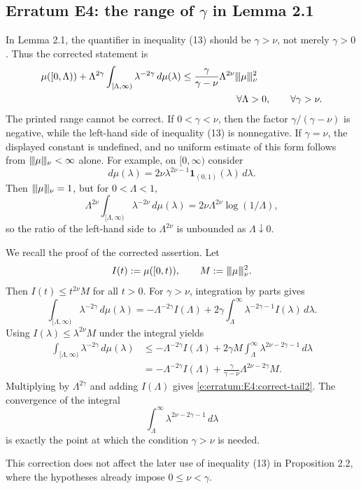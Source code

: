 
\subsection*{Erratum E4: the range of $\gamma$ in Lemma 2.1}
\label{s:erratum:E4}

In Lemma 2.1, the quantifier in inequality (13) should be
$\gamma>\nu$, not merely $\gamma>0$.  Thus the corrected statement is
\begin{equation}
\begin{split}
	\mu([0,\Lambda))
	+
	\Lambda^{2\gamma}
	\int_{[\Lambda,\infty)}\lambda^{-2\gamma}\,d\mu(\lambda)
	&\leq
	\frac{\gamma}{\gamma-\nu}
	\Lambda^{2\nu}\vert\kern-0.25ex\vert\kern-0.25ex\vert \mu \vert\kern-0.25ex \vert\kern-0.25ex\vert_{ \nu }^{2} \\
	&\hspace{2cm}
	\forall\Lambda>0,
	\qquad
	\forall\gamma>\nu .
\end{split}
\label{e:erratum:E4:correct-tail2}
\end{equation}
The printed range cannot be correct.  If $0<\gamma<\nu$, then the factor
$\gamma/(\gamma-\nu)$ is negative, while the left-hand side of
inequality (13) is nonnegative.  If $\gamma=\nu$, the displayed constant is
undefined, and no uniform estimate of this form follows from
$\vert\kern-0.25ex\vert\kern-0.25ex\vert \mu \vert\kern-0.25ex \vert\kern-0.25ex\vert_{ \nu }<\infty$ alone.  For example, on $[0,\infty)$ consider
\[
	d\mu(\lambda)
	=
	2\nu\lambda^{2\nu-1}\mathbf{1}_{(0,1)}(\lambda)\,d\lambda .
\]
Then $\vert\kern-0.25ex\vert\kern-0.25ex\vert \mu \vert\kern-0.25ex \vert\kern-0.25ex\vert_{ \nu }=1$, but for $0<\Lambda<1$,
\[
	\Lambda^{2\nu}
	\int_{[\Lambda,\infty)}\lambda^{-2\nu}\,d\mu(\lambda)
	=
	2\nu\Lambda^{2\nu}\log(1/\Lambda),
\]
so the ratio of the left-hand side to $\Lambda^{2\nu}$ is unbounded as
$\Lambda\downarrow0$.

We recall the proof of the corrected assertion.  Let
\[
	I(t):=\mu([0,t)),
	\qquad
	M:=\vert\kern-0.25ex\vert\kern-0.25ex\vert \mu \vert\kern-0.25ex \vert\kern-0.25ex\vert_{ \nu }^{2}.
\]
Then $I(t)\leq t^{2\nu}M$ for all $t>0$.  For $\gamma>\nu$, integration by
parts gives
\[
	\int_{[\Lambda,\infty)}\lambda^{-2\gamma}\,d\mu(\lambda)
	=
	-\Lambda^{-2\gamma}I(\Lambda)
	+
	2\gamma\int_{\Lambda}^{\infty}
	\lambda^{-2\gamma-1}I(\lambda)\,d\lambda .
\]
Using $I(\lambda)\leq\lambda^{2\nu}M$ under the integral yields
\[
\begin{split}
	\int_{[\Lambda,\infty)}\lambda^{-2\gamma}\,d\mu(\lambda)
	&\leq
	-\Lambda^{-2\gamma}I(\Lambda)
	+
	2\gamma M\int_{\Lambda}^{\infty}
	\lambda^{2\nu-2\gamma-1}\,d\lambda \\
	&=
	-\Lambda^{-2\gamma}I(\Lambda)
	+
	\frac{\gamma}{\gamma-\nu}
	\Lambda^{2\nu-2\gamma}M .
\end{split}
\]
Multiplying by $\Lambda^{2\gamma}$ and adding $I(\Lambda)$ gives
\eqref{e:erratum:E4:correct-tail2}.  The convergence of the integral
\[
	\int_{\Lambda}^{\infty}\lambda^{2\nu-2\gamma-1}\,d\lambda
\]
is exactly the point at which the condition $\gamma>\nu$ is needed.

This correction does not affect the later use of inequality (13) in
Proposition 2.2, where the hypotheses already impose
$0\leq\nu<\gamma$.
